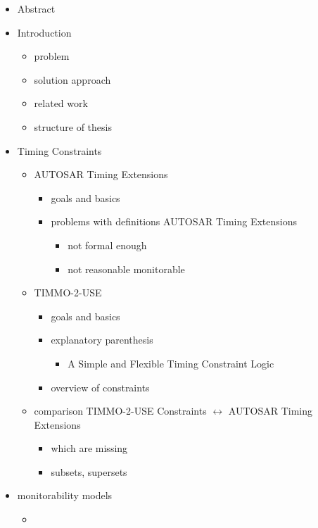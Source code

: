 \documentclass[]{article}
\begin{document}
\begin{itemize}
	\item
		Abstract
	\item
		Introduction
		\begin{itemize}
			\item
				problem
			\item
				solution approach
			\item
				related work
			\item
				structure of thesis
		\end{itemize}
	\item
		Timing Constraints
		\begin{itemize}
			\item
				AUTOSAR Timing Extensions
				\begin{itemize}
					\item
						goals and basics
					\item
						problems with definitions AUTOSAR Timing Extensions
						\begin{itemize}
							\item
								not formal enough
							\item
								not reasonable monitorable
						\end{itemize}
				\end{itemize}
			\item
				TIMMO-2-USE
				\begin{itemize}
					\item
						goals and basics
					\item
						explanatory parenthesis
						\begin{itemize}
							\item	
								A Simple and Flexible Timing Constraint Logic
						\end{itemize}
					\item
						overview of constraints
				\end{itemize}
			\item
				comparison TIMMO-2-USE Constraints $\leftrightarrow$ AUTOSAR Timing Extensions
				\begin{itemize}
					\item
						which are missing
					\item
						subsets, supersets
				\end{itemize}
		\end{itemize}
	\item
		monitorability models
		\begin{itemize}
			\item

\end{itemize}
\end{itemize}
\end{document}
